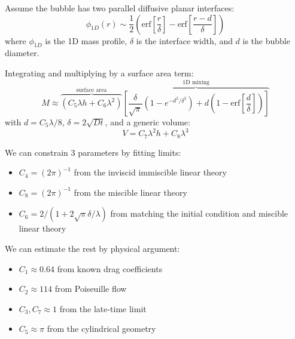 \documentclass[12pt]{beamer}
\begin{document}
\begin{frame}
Assume the bubble has two parallel diffusive planar interfaces:
\begin{equation*}
\phi_{1D}(r) \sim \frac{1}{2} \left(\text{erf}\left[\frac{r}{\delta}\right] - \text{erf}\left[\frac{r - d}{\delta}\right] \right)
\end{equation*}
where $\phi_{1D}$ is the 1D mass profile, $\delta$ is the interface width, and $d$ is the bubble diameter.
\vspace{20pt}\pause

Integrating and multiplying by a surface area term:
\begin{equation*}
M \approx \overbrace{\left(C_5 \lambda h + C_6 \lambda^2\right)}^{\text{surface area}} \overbrace{\left[\frac{\delta}{\sqrt{\pi}} \left(1 - e^{-d^2 / \delta^2}\right) + d \left(1 - \text{erf}\left[\frac{d}{\delta}\right]\right)\right]}^{\text{1D mixing}}
\end{equation*}
with $d = C_5 \lambda / 8$, $\delta = 2 \sqrt{D t}$, and a generic volume:
\begin{equation*}
V = C_7 \lambda^2 h + C_8 \lambda^3
\end{equation*}
\end{frame}

\begin{frame}
We can constrain 3 parameters by fitting limits:
\begin{itemize}
  \item $C_4 = (2 \pi)^{-1}$ from the inviscid immiscible linear theory
  \item $C_8 = (2 \pi)^{-1}$ from the miscible linear theory
  \item $C_6 = 2/(1 + 2 \sqrt{\pi} \delta / \lambda)$ from matching the initial condition and miscible linear theory 
\end{itemize}\pause \vspace{10pt}

We can estimate the rest by physical argument:
\begin{itemize}
  \item $C_1 \approx 0.64$ from known drag coefficients
  \item $C_2 \approx 114$ from Poiseuille flow
  \item $C_3, C_7 \approx 1$ from the late-time limit
  \item $C_5 \approx \pi$ from the cylindrical geometry
\end{itemize}
\end{frame}
\end{document}
